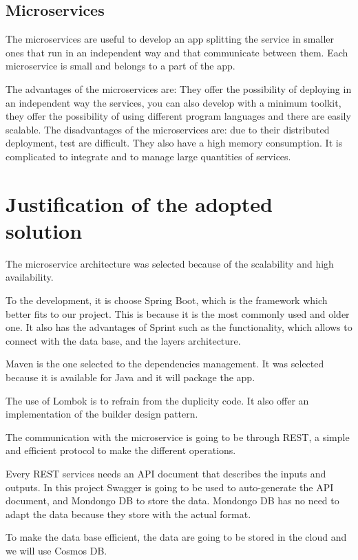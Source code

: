 \documentclass[12pt]{report} %
\begin{document}
\subsection{Microservices}

The microservices are useful to develop an app splitting the service in smaller ones that run in an independent way and that communicate between them. Each microservice is small and belongs to a part of the app.

The advantages of the microservices are: They offer the possibility of deploying in an independent way the services, you can also develop with a minimum toolkit, they offer the possibility of using different program languages and there are easily scalable. The disadvantages of the microservices are: due to their distributed deployment, test are difficult. They also have a high memory consumption. It is complicated to integrate and to manage large quantities of services. 



\section{Justification of the adopted solution}

The microservice architecture was selected because of the scalability and high availability.

To the development, it is choose Spring Boot, which is the framework which better fits to our project. This is because it is the most commonly used and older one. It also has the advantages of Sprint such as the functionality, which allows to connect with the data base, and the layers architecture.

Maven is the one selected to the dependencies management. It was selected because it is available for Java and it will package the app.

The use of Lombok is to refrain from the duplicity code. It also offer an implementation of the builder design pattern.

The communication with the microservice is going to be through REST, a simple and efficient protocol to make the different operations.

Every REST services needs an API document that describes the inputs and outputs. In this project Swagger is going to be used to auto-generate the API document, and Mondongo DB to store the data. Mondongo DB has no need to adapt the data because they store with the actual format.

To make the data base efficient, the data are going to be stored in the cloud and we will use Cosmos DB.
\end{document}
